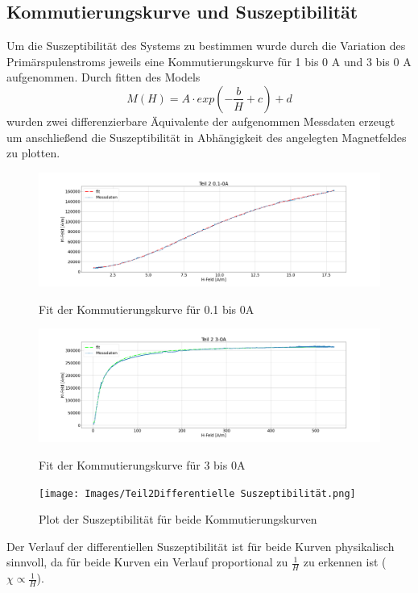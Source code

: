     \subsection{Kommutierungskurve und Suszeptibilität}
        Um die Suszeptibilität des Systems zu bestimmen wurde durch die Variation des Primärspulenstroms jeweils eine Kommutierungskurve für 1 bis 0 A und 3 bis 0 A aufgenommen.
        Durch fitten des Models 
        \begin{equation}
            M(H) = A \cdot exp(-\frac{b}{H} + c) + d
        \end{equation}
        wurden zwei differenzierbare Äquivalente der aufgenommen Messdaten erzeugt um anschließend die Suszeptibilität in Abhängigkeit des angelegten Magnetfeldes zu plotten.
        \begin{figure}[H]
            \centering
            \includegraphics[width=\textwidth]{Images/Teil2Teil 2 1-0A.png}
            \label{Teil2-1A}
            \caption{Fit der Kommutierungskurve für 0.1 bis 0A}
        \end{figure}
        \begin{figure}[H]
            \centering
            \includegraphics[width=\textwidth]{Images/Teil2Teil 2 3-0A.png}
            \label{Teil2-3A}
            \caption{Fit der Kommutierungskurve für 3 bis 0A}
        \end{figure}
        \begin{figure}[H]
            \centering
            \texttt{[image: Images/Teil2Differentielle Suszeptibilität.png]}
            \label{DiffSus}
            \caption{Plot der Suszeptibilität für beide Kommutierungskurven}
        \end{figure}
            Der Verlauf der differentiellen Suszeptibilität ist für beide Kurven physikalisch sinnvoll, da für beide Kurven ein Verlauf proportional zu $\frac{1}{H}$ zu erkennen ist ($\chi \propto \frac{1}{H}$).%
